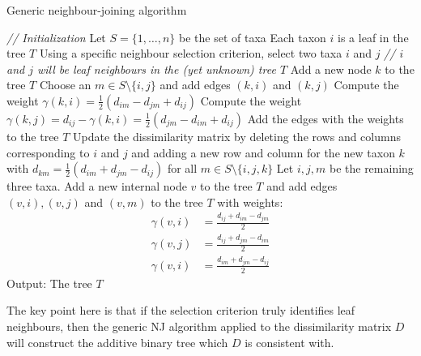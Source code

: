     \begin{algorithm}
        \caption{Generic neighbour-joining algorithm}
        \begin{algorithmic}
            \State \textit{// Initialization}
            \State Let $S = \{1,\dots,n\}$ be the set of taxa
            \State Each taxon $i$ is a leaf in the tree $T$
                \State Using a specific neighbour selection criterion, select 
                two taxa $i$ and $j$ 
                \State \textit{// $i$ and $j$ will be leaf neighbours in the 
                (yet unknown) tree $T$}
                \State Add a new node $k$ to the tree $T$
                \State Choose an $m \in S \setminus \{i,j\}$ and add edges 
                $(k,i)$ and $(k,j)$ 
                \State Compute the weight
                $\gamma(k,i)=\frac{1}{2}(d_{im}-d_{jm}+d_{ij})$ 
                \State Compute the weight 
                $\gamma(k,j)=d_{ij}-\gamma(k,i)=\frac{1}{2}(d_{jm}-d_{im}+d_{ij})$
                \State
                \State Add the edges with the weights to the tree $T$
                \State Update the dissimilarity matrix by deleting the rows and 
                columns 
                \State corresponding to $i$ and $j$ and adding a new 
                row and column for the 
                \State new taxon $k$ with 
                $d_{km}=\frac{1}{2}(d_{im}+d_{jm}-d_{ij})$ for all $m \in S 
                \setminus \{i,j,k\}$
            \EndWhile
            \State Let $i,j,m$ be the remaining three taxa. Add a new internal 
            node $v$ to the tree $T$ and add edges $(v,i), (v,j)$ and $(v,m)$ 
            to the tree $T$ with weights:
            \begin{align*}
                \gamma(v,i)&=\frac{d_{ij}+d_{im}-d_{jm}}{2}\\
                \gamma(v,j)&=\frac{d_{ij}+d_{jm}-d_{im}}{2}\\
                \gamma(v,i)&=\frac{d_{im}+d_{jm}-d_{ij}}{2}
            \end{align*}
            \State Output: The tree $T$
            \EndProcedure
        \end{algorithmic}
    \end{algorithm}
    
    The key point here is that if the selection criterion truly identifies leaf 
    neighbours, then the generic NJ algorithm applied to the dissimilarity 
    matrix $D$ will construct the additive binary tree which $D$ is consistent 
    with.
    
